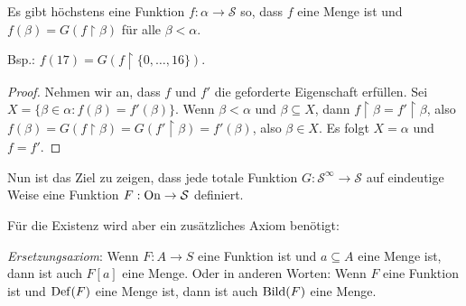 \begin{lemma}
	Es gibt höchstens eine Funktion $f:\alpha\to \mathcal{S}$ so, dass $f$ eine Menge ist und $f(\beta)=G(f\upharpoonright\beta)$ für alle $\beta < \alpha$.
\end{lemma}
Bsp.: $f(17)=G(f\upharpoonright\{0,\dots,16\})$.
\begin{proof}
	Nehmen wir an, dass $f$ und $f'$ die geforderte Eigenschaft erfüllen. Sei $X=\{\beta \in\alpha : f(\beta)=f'(\beta)\}$. Wenn $\beta < \alpha$ und $\beta\subseteq X$, dann $f\upharpoonright\beta =f'\upharpoonright\beta$, also $f(\beta)=G(f\upharpoonright\beta)=G(f'\upharpoonright\beta)=f'(\beta)$, also $\beta\in X$. Es folgt $X=\alpha$ und $f=f'$.
\end{proof}

Nun ist das Ziel zu zeigen, dass jede totale Funktion $G:\mathcal{S}^\infty\to\mathcal{S}$ auf eindeutige Weise eine Funktion $F:\operatorname{On}\to\mathcal{S}$ definiert.

Für die Existenz wird aber ein zusätzliches Axiom benötigt:

\textit{Ersetzungsaxiom}: Wenn $F:A\to S$ eine Funktion ist und $a\subseteq A$ eine Menge ist, dann ist auch $F[a]$ eine Menge. Oder in anderen Worten: Wenn $F$ eine Funktion ist und $\operatorname{Def}(F)$ eine Menge ist, dann ist auch $\operatorname{Bild}(F)$ eine Menge.

